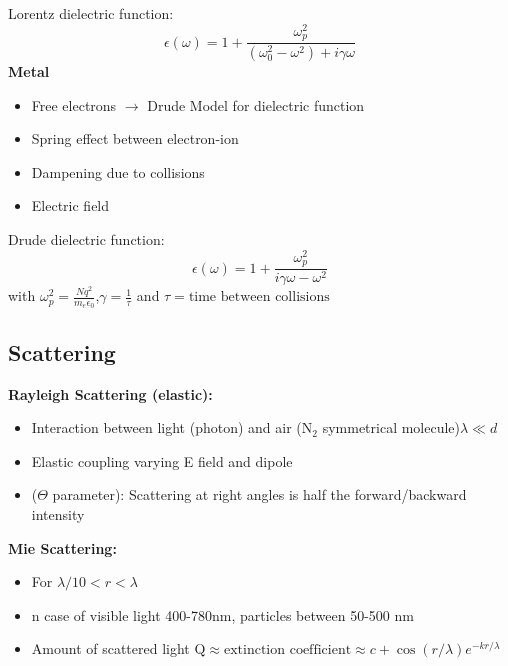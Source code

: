 Lorentz dielectric function:
\[
\epsilon(\omega) = 1 + \frac{\omega^2_p}{(\omega_0^2-\omega^2)+i\gamma \omega}
\]
\textbf{Metal}
\begin{itemize}
    \item Free electrons \(\rightarrow\) Drude Model for dielectric function
    \item Spring effect between electron-ion
    \item Dampening due to collisions
    \item Electric field
\end{itemize}

Drude dielectric function:
\[
\epsilon(\omega) = 1 + \frac{\omega^2_p}{i\gamma \omega-\omega^2}
\]
with \(\omega^2_p = \frac{Nq^2}{m_e\epsilon_0}\),\(\gamma = \frac{1}{\tau}\) and \(\tau = \text{time between collisions}\)

\subsection{Scattering}
 \textbf{Rayleigh Scattering (elastic):}
 \begin{itemize}
    \item Interaction between light (photon) and air (\(\text{N}_2\) symmetrical molecule)\(\lambda \ll d\)
    \item Elastic coupling varying E field and dipole
    \item (\(\Theta\) parameter): Scattering at right angles is half the forward/backward intensity
 \end{itemize}
 \textbf{Mie Scattering:}
 \begin{itemize}
    \item For \(\lambda/10 < r < \lambda\)
    \item n case of visible light 400-780nm, particles between 50-500 nm
    \item Amount of scattered light \(\text{Q} \approx \text{extinction coefficient}\approx c+\cos(r/\lambda)e^{-kr/\lambda}\)
 \end{itemize}